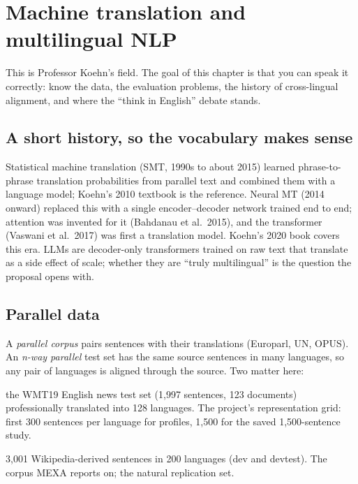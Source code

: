 \section{Machine translation and multilingual NLP}
\label{ch:mt}

This is Professor Koehn's field. The goal of this chapter is that you can
speak it correctly: know the data, the evaluation problems, the history of
cross-lingual alignment, and where the ``think in English'' debate stands.

\subsection{A short history, so the vocabulary makes sense}

Statistical machine translation (SMT, 1990s to about 2015) learned
phrase-to-phrase translation probabilities from parallel text and combined
them with a language model; Koehn's 2010 textbook is the reference. Neural MT
(2014 onward) replaced this with a single encoder--decoder network trained
end to end; attention was invented for it (Bahdanau et al.\ 2015), and the
transformer (Vaswani et al.\ 2017) was first a translation model. Koehn's 2020
book covers this era. LLMs are decoder-only transformers trained on raw text
that translate as a side effect of scale; whether they are ``truly
multilingual'' is the question the proposal opens with.

\subsection{Parallel data}

A \emph{parallel corpus} pairs sentences with their translations (Europarl,
UN, OPUS). An \emph{n-way parallel} test set has the same source sentences
in many languages, so any pair of languages is aligned through the source.
Two matter here:

\begin{description}[leftmargin=2.2cm, style=nextline, itemsep=1pt]
\item[NTREX-128] the WMT19 English news test set (1{,}997 sentences, 123 documents) professionally translated into 128 languages. The project's representation grid: first 300 sentences per language for profiles, 1{,}500 for the saved 1,500-sentence study.
\item[FLORES-200] 3{,}001 Wikipedia-derived sentences in 200 languages (dev and devtest). The corpus MEXA reports on; the natural replication set.
\end{description}

